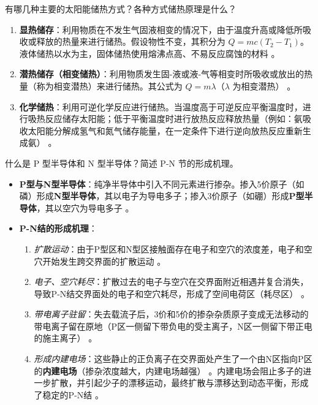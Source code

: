 \begin{problem}\label{exer:think_04_solar_09}
有哪几种主要的太阳能储热方式？各种方式储热原理是什么？
\end{problem}

\begin{solution}
\begin{enumerate}
\item \textbf{显热储存}：利用物质在不发生气固液相变的情况下，由于温度升高或降低所吸收或释放的热量来进行储热。假设物性不变，其积分为 \(Q=mc(T_2-T_1)\)。液体储热以水为主，固体储热使用熔沸点高、不易反应腐蚀的材料 。
\item \textbf{潜热储存（相变储热）}：利用物质发生固-液或液-气等相变时所吸收或放出的热量（称为相变潜热）来进行储热。其公式为 \(Q = m\lambda\)（\(\lambda\) 为相变潜热） 。
\item \textbf{化学储热}：利用可逆化学反应进行储热。当温度高于可逆反应平衡温度时，进行吸热反应储存太阳能；低于平衡温度时进行放热反应释放热量（例如：氨吸收太阳能分解成氢气和氮气储存能量，在一定条件下进行逆向放热反应重新生成氨） 。
\end{enumerate}
\end{solution}

\begin{problem}\label{exer:think_04_solar_10}
什么是 P 型半导体和 N 型半导体？简述 P-N 节的形成机理。
\end{problem}

\begin{solution}
\begin{itemize}
\item \textbf{P型与N型半导体}：纯净半导体中引入不同元素进行掺杂。掺入5价原子（如磷）形成\textbf{N型半导体}，其以电子为导电多子；掺入3价原子（如硼）形成\textbf{P型半导体}，其以空穴为导电多子 。
\item \textbf{P-N结的形成机理}：
\begin{enumerate}
\item \emph{扩散运动}：由于P型区和N型区接触面存在电子和空穴的浓度差，电子和空穴开始发生跨交界面的扩散运动 。
\item \emph{电子、空穴耗尽}：扩散过去的电子与空穴在交界面附近相遇并复合消失，导致P-N结交界面处的电子和空穴耗尽，形成了空间电荷区（耗尽区） 。
\item \emph{带电离子驻留}：失去载流子后，3价和5价的掺杂杂质原子变成无法移动的带电离子留在原地（P区一侧留下带负电的受主离子，N区一侧留下带正电的施主离子） 。
\item \emph{形成内建电场}：这些静止的正负离子在交界面处产生了一个由N区指向P区的\textbf{内建电场}（掺杂浓度越大，内建电场越强） 。内建电场会阻止多子的进一步扩散，并引起少子的漂移运动，最终扩散与漂移达到动态平衡，形成了稳定的P-N结 。
\end{enumerate}
\end{itemize}
\end{solution}

